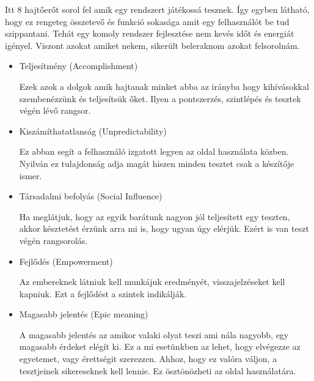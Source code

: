 Itt 8 hajtőerőt sorol fel amik egy rendszert játékossá tesznek. Így egyben látható, hogy ez rengeteg összetevő és funkció sokasága amit egy felhasználót be tud szippantani. Tehát egy komoly rendszer fejlesztése nem kevés időt és energiát igényel. Viszont azokat amiket nekem, sikerült beleraknom azokat felsorolnám.

\begin{itemize}
    \item {Teljesítmény (Accomplishment)}
          \begin{addmargin}[\parindent]{0pt}
              Ezek azok a dolgok amik hajtanak minket abba az irányba hogy kihívásokkal szembenézzünk és teljesítsük őket. Ilyen a pontszerzés, szintlépés és tesztek végén lévő rangsor.
          \end{addmargin}
    \item {Kiszámíthatatlanság (Unpredictability)}
          \begin{addmargin}[\parindent]{0pt}
              Ez abban segít a felhasználó izgatott legyen az oldal használata közben. Nyilván ez tulajdonság adja magát hiszen minden tesztet csak a készítője ismer.
          \end{addmargin}
    \item {Társadalmi befolyás (Social Influence)}
          \begin{addmargin}[\parindent]{0pt}
              Ha meglátjuk, hogy az egyik barátunk nagyon jól teljesített egy teszten, akkor késztetést érzünk arra mi is, hogy ugyan úgy elérjük. Ezért is van teszt végén rangsorolás.
          \end{addmargin}
    \item {Fejlődés (Empowerment)}
          \begin{addmargin}[\parindent]{0pt}
            Az embereknek látniuk kell munkájuk eredményét, visszajelzéseket kell kapniuk. Ezt a fejlődést a szintek indikálják.
          \end{addmargin}
    \item {Magasabb jelentés (Epic meaning)}
          \begin{addmargin}[\parindent]{0pt}
              A magasabb jelentés az amikor valaki olyat teszi ami nála nagyobb, egy magasabb érdeket elégít ki. Ez a mi esetünkben az lehet, hogy elvégezze az egyetemet, vagy érettségit szerezzen. Ahhoz, hogy ez valóra váljon, a tesztjeinek sikereseknek kell lennie. Ez ösztönözheti az oldal használatára.
          \end{addmargin}
\end{itemize}